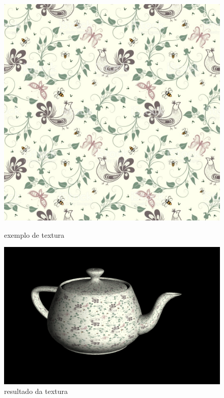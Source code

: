 \documentclass[a4paper]{report}
\begin{document}
\begin{figure}[H]
    \centering
    \begin{minipage}{0.40\textwidth}
        \centering
        \includegraphics[width=\textwidth]{images/flowery_patern.jpg}
        \caption{exemplo de textura}
    \end{minipage}\hfill
    \begin{minipage}{0.59\textwidth}
        \centering
        \includegraphics[width=\textwidth]{images/teapot_rendered.png}
        \caption{resultado da textura}
    \end{minipage}\hfill
\end{figure}
\end{document}
